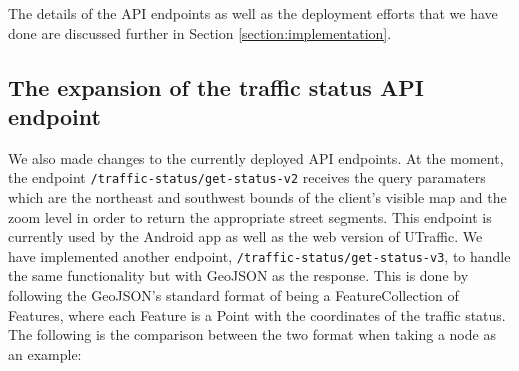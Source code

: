 The details of the API endpoints as well as the deployment efforts that we have done are discussed further in Section \ref{section:implementation}.

\subsection{The expansion of the traffic status API endpoint}
We also made changes to the currently deployed API endpoints. At the moment, the endpoint \lstinline{/traffic-status/get-status-v2} receives the query paramaters which are the northeast and southwest bounds of the client's visible map and the zoom level in order to return the appropriate street segments. This endpoint is currently used by the Android app as well as the web version of UTraffic. We have implemented another endpoint, \lstinline{/traffic-status/get-status-v3}, to handle the same functionality but with GeoJSON as the response. This is done by following the GeoJSON's standard format of being a FeatureCollection of Features, where each Feature is a Point with the coordinates of the traffic status. The following is the comparison between the two format when taking a node as an example:

